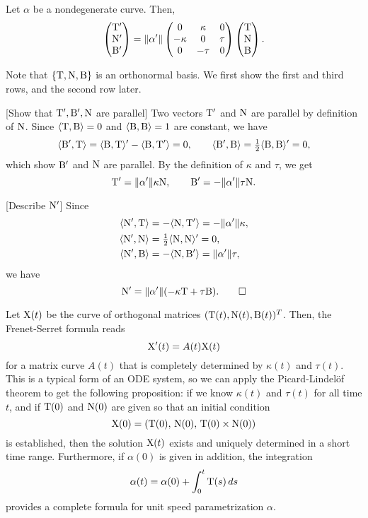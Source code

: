 \documentclass{../exp}
\def\a{\alpha}
\begin{document}
\begin{thm}
Let $\a$ be a nondegenerate curve.
Then,
\[\begin{pmatrix}\rT'\\\rN'\\\rB'\end{pmatrix}=\|\a'\|\begin{pmatrix}0&\kappa&0\\-\kappa&0&\tau\\0&-\tau&0\end{pmatrix}\begin{pmatrix}\rT\\\rN\\\rB\end{pmatrix}.\]
\end{thm}
\begin{pf}
Note that $\{\mathrm{T},\mathrm{N},\mathrm{B}\}$ is an orthonormal basis.
We first show the first and third rows, and the second row later.

[Show that $\mathrm{T}',\mathrm{B}',\mathrm{N}$ are parallel]
Two vectors $\mathrm{T}'$ and $\mathrm{N}$ are parallel by definition of $\mathrm{N}$.
Since $\langle\mathrm{T},\mathrm{B}\rangle=0$ and $\langle\mathrm{B},\mathrm{B}\rangle=1$ are constant, we have
\[\langle\mathrm{B}',\mathrm{T}\rangle=\langle\mathrm{B},\mathrm{T}\rangle'-\langle\mathrm{B},\mathrm{T}'\rangle=0,\qquad\langle\mathrm{B}',\mathrm{B}\rangle=\tfrac12\langle\mathrm{B},\mathrm{B}\rangle'=0,\]
which show $\mathrm{B}'$ and $\mathrm{N}$ are parallel.
By the definition of $\kappa$ and $\tau$, we get
\[\rT'=\|\a'\|\kappa\rN,\qquad\rB'=-\|\a'\|\tau\rN.\]

[Describe $\mathrm{N}'$]
Since
\begin{align*}
\<\rN',\rT\>&=-\<\rN,\rT'\>=-\|\a'\|\kappa,\\
\<\rN',\rN\>&=\tfrac12\<\rN,\rN\>'=0,\\
\<\rN',\rB\>&=-\<\rN,\rB'\>=\|\a'\|\tau,
\end{align*}
we have
\[\rN'=\|\a'\|(-\kappa\rT+\tau\rB).\qedhere\]
\end{pf}
\begin{rmk}
Let $\mathrm{X}(t)$ be the curve of orthogonal matrices $(\mathrm{T}(t),\mathrm{N}(t),\mathrm{B}(t))^T$.
Then, the Frenet-Serret formula reads
\[\mathrm{X}'(t)=A(t)\mathrm{X}(t)\]
for a matrix curve $A(t)$ that is completely determined by $\kappa(t)$ and $\tau(t)$.
This is a typical form of an ODE system, so we can apply the Picard-Lindel\"of theorem to get the following proposition: if we know $\kappa(t)$ and $\tau(t)$ for all time $t$, and if $\mathrm{T}(0)$ and $\mathrm{N}(0)$ are given so that an initial condition
\[\mathrm{X}(0)=(\mathrm{T}(0),\,\mathrm{N}(0),\,\mathrm{T}(0)\times\mathrm{N}(0))\]
is established, then the solution $\mathrm{X}(t)$ exists and uniquely determined in a short time range.
Furthermore, if $\a(0)$ is given in addition, the integration
\[\a(t)=\a(0)+\int_0^t\rT(s)\,ds\]
provides a complete formula for unit speed parametrization $\a$.
\end{rmk}
\end{document}
